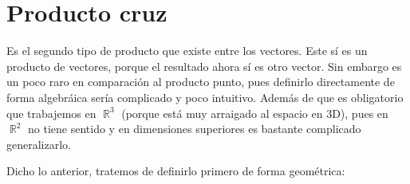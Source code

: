 \documentclass[12pt, fleqn]{report}                             %
\newcommand \Quote {\qq}                                        %
\theoremstyle{break}                                            %
\DeclareMathOperator \Reals        {\mathbb{R}}                 %
\begin{document}
        \section{Producto cruz}
        
            Es el segundo tipo de producto que existe entre los vectores. Este sí es un producto \Quote{genuino} de vectores, porque el resultado ahora sí es otro vector. Sin embargo es un poco raro en comparación al producto punto, pues definirlo directamente de forma algebráica sería complicado y poco intuitivo. Además de que es obligatorio que trabajemos en $\Reals^3$ (porque está muy arraigado al espacio en 3D), pues en $\Reals^2$ no tiene sentido y en dimensiones superiores es bastante complicado generalizarlo.
            
            Dicho lo anterior, tratemos de definirlo primero de forma geométrica:
            
            
\end{document}
